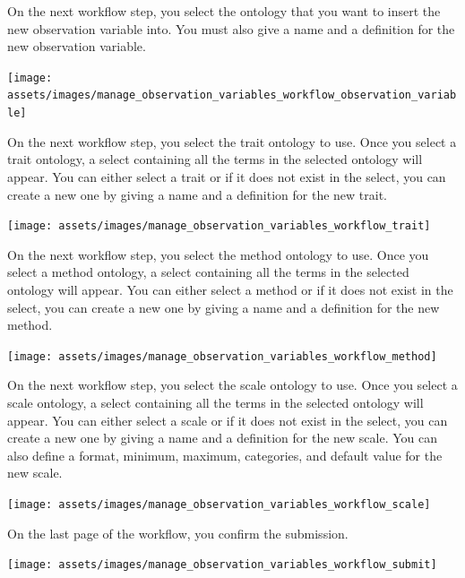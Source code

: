 \documentclass[
  12pt,
]{book}
\begin{document}
On the next workflow step, you select the ontology that you want to insert the new observation variable into. You must also give a name and a definition for the new observation variable.

\begin{center}\texttt{[image: assets/images/manage\_observation\_variables\_workflow\_observation\_variable]} \end{center}

On the next workflow step, you select the trait ontology to use. Once you select a trait ontology, a select containing all the terms in the selected ontology will appear. You can either select a trait or if it does not exist in the select, you can create a new one by giving a name and a definition for the new trait.

\begin{center}\texttt{[image: assets/images/manage\_observation\_variables\_workflow\_trait]} \end{center}

On the next workflow step, you select the method ontology to use. Once you select a method ontology, a select containing all the terms in the selected ontology will appear. You can either select a method or if it does not exist in the select, you can create a new one by giving a name and a definition for the new method.

\begin{center}\texttt{[image: assets/images/manage\_observation\_variables\_workflow\_method]} \end{center}

On the next workflow step, you select the scale ontology to use. Once you select a scale ontology, a select containing all the terms in the selected ontology will appear. You can either select a scale or if it does not exist in the select, you can create a new one by giving a name and a definition for the new scale. You can also define a format, minimum, maximum, categories, and default value for the new scale.

\begin{center}\texttt{[image: assets/images/manage\_observation\_variables\_workflow\_scale]} \end{center}

On the last page of the workflow, you confirm the submission.

\begin{center}\texttt{[image: assets/images/manage\_observation\_variables\_workflow\_submit]} \end{center}
\end{document}
